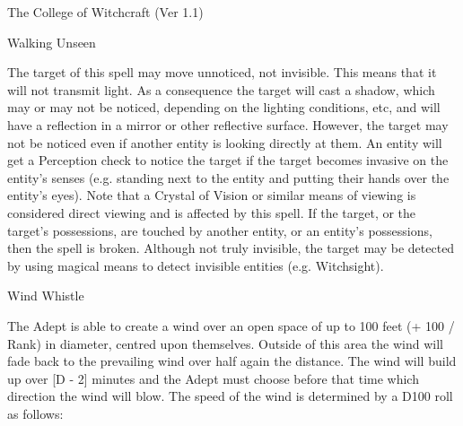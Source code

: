\begin{Chapter}{The College of Witchcraft (Ver 1.1)}
\begin{spell}[G-12]{Walking Unseen}

\begin{effects}
The target of this spell may move unnoticed, not invisible.  This
means that it will not transmit light. As a consequence the target
will cast a shadow, which may or may not be noticed, depending on the
lighting conditions, etc, and will have a reflection in a mirror or
other reflective surface.  However, the target may not be noticed even
if another entity is looking directly at them.  An entity will get a
Perception check to notice the target if the target becomes invasive
on the entity’s senses (e.g. standing next to the entity and putting
their hands over the entity’s eyes).  Note that a Crystal of Vision or
similar means of viewing is considered direct viewing and is affected
by this spell.  If the target, or the target’s possessions, are
touched by another entity, or an entity’s possessions, then the spell
is broken.  Although not truly invisible, the target may be detected
by using magical means to detect invisible entities (e.g.
Witchsight).
\end{effects}
\end{spell}

\begin{spell}[G-13]{Wind Whistle}

\begin{effects}
The Adept is able to create a wind over an open space of up to 100
feet (+ 100 / Rank) in diameter, centred upon themselves. Outside of
this area the wind will fade back to the prevailing wind over half
again the distance. The wind will build up over [D - 2] minutes and
the Adept must choose before that time which direction the wind will
blow.  The speed of the wind is determined by a D100 roll as follows:


\end{effects}
\end{spell}
\end{Chapter}
